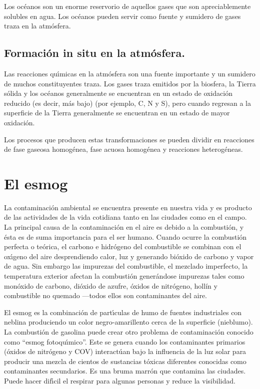 Los oc\'eanos son un enorme reservorio de aquellos gases que son apreciablemente solubles en agua. Los oc\'eanos pueden servir como fuente y sumidero de gases traza en la atm\'osfera.

\subsection{Formaci\'on in situ en la atm\'osfera.}

Las reacciones qu\'{\i}micas en la atm\'osfera son una fuente importante y un sumidero de muchos constituyentes traza. Los gases traza emitidos por la biosfera, la Tierra s\'olida y los oc\'eanos generalmente se encuentran en un estado de oxidaci\'on reducido (es decir, m\'as bajo) (por ejemplo, C, N y S), pero cuando regresan a la superficie de la Tierra generalmente se encuentran en un estado de  mayor oxidaci\'on.

Los procesos que producen estas transformaciones se pueden dividir en reacciones de fase gaseosa homog\'enea, fase acuosa homog\'enea y reacciones heterog\'eneas.

 \section{El esmog}
\label{sgmog}

 La contaminaci\'on ambiental se encuentra presente en nuestra vida y es producto de las actividades de la vida cotidiana tanto en las ciudades como en el campo. La principal causa de la contaminaci\'on en el aire es debido a la combusti\'on, y \'esta es de suma importancia para el ser humano. Cuando ocurre la combusti\'on perfecta o te\'orica, el carbono e hidr\'ogeno del combustible se combinan con el ox\'{\i}geno del aire desprendiendo calor, luz y generando bi\'oxido de carbono y vapor de agua. Sin embargo las impurezas del combustible, el mezclado imperfecto, la temperatura exterior afectan la combusti\'on gener\'andose impurezas tales como mon\'oxido de carbono, di\'oxido de azufre, \'oxidos de nitr\'ogeno, holl\'in y combustible no quemado ---todos ellos son contaminantes del aire.
 
 El esmog es la combinaci\'on de part\'{\i}culas de humo de fuentes industriales con neblina produciendo un color negro-amarillento cerca de la superficie (nieblumo). La combusti\'on de gasolina puede crear otro problema de contaminaci\'on conocido como ``esmog fotoqu\'{\i}mico''. Este se genera cuando los contaminantes primarios (\'oxidos de nitr\'ogeno y COV) interact\'uan bajo la influencia de la luz solar para producir una mezcla de cientos de sustancias t\'oxicas diferentes conocidas como contaminantes secundarios. Es una bruma marr\'on que contamina las ciudades. Puede hacer dif\'{\i}cil el respirar para algunas personas y reduce la visibilidad.

